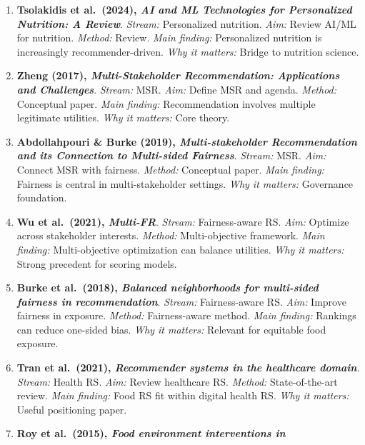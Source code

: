 \documentclass[
  letterpaper,
  DIV=11,
  numbers=noendperiod]{scrartcl}
\begin{document}
\begin{enumerate}
  \textbf{Workplace explanation study (2025)}. \emph{Stream:}
  Explainability. \emph{Aim:} Study explanations in deployment.
  \emph{Method:} User-centered deployment study. \emph{Main finding:}
  Explanations improve understanding and control. \emph{Why it matters:}
  Relevant for trust and adoption.
\item
  \textbf{Tsolakidis et al.~(2024), \emph{AI and ML Technologies for
  Personalized Nutrition: A Review}}. \emph{Stream:} Personalized
  nutrition. \emph{Aim:} Review AI/ML for nutrition. \emph{Method:}
  Review. \emph{Main finding:} Personalized nutrition is increasingly
  recommender-driven. \emph{Why it matters:} Bridge to nutrition
  science.
\item
  \textbf{Zheng (2017), \emph{Multi-Stakeholder Recommendation:
  Applications and Challenges}}. \emph{Stream:} MSR. \emph{Aim:} Define
  MSR and agenda. \emph{Method:} Conceptual paper. \emph{Main finding:}
  Recommendation involves multiple legitimate utilities. \emph{Why it
  matters:} Core theory.
\item
  \textbf{Abdollahpouri \& Burke (2019), \emph{Multi-stakeholder
  Recommendation and its Connection to Multi-sided Fairness}}.
  \emph{Stream:} MSR. \emph{Aim:} Connect MSR with fairness.
  \emph{Method:} Conceptual paper. \emph{Main finding:} Fairness is
  central in multi-stakeholder settings. \emph{Why it matters:}
  Governance foundation.
\item
  \textbf{Wu et al.~(2021), \emph{Multi-FR}}. \emph{Stream:}
  Fairness-aware RS. \emph{Aim:} Optimize across stakeholder interests.
  \emph{Method:} Multi-objective framework. \emph{Main finding:}
  Multi-objective optimization can balance utilities. \emph{Why it
  matters:} Strong precedent for scoring models.
\item
  \textbf{Burke et al.~(2018), \emph{Balanced neighborhoods for
  multi-sided fairness in recommendation}}. \emph{Stream:}
  Fairness-aware RS. \emph{Aim:} Improve fairness in exposure.
  \emph{Method:} Fairness-aware method. \emph{Main finding:} Rankings
  can reduce one-sided bias. \emph{Why it matters:} Relevant for
  equitable food exposure.
\item
  \textbf{Tran et al.~(2021), \emph{Recommender systems in the
  healthcare domain}}. \emph{Stream:} Health RS. \emph{Aim:} Review
  healthcare RS. \emph{Method:} State-of-the-art review. \emph{Main
  finding:} Food RS fit within digital health RS. \emph{Why it matters:}
  Useful positioning paper.
\item
  \textbf{Roy et al.~(2015), \emph{Food environment interventions in
}}
\end{enumerate}
\end{document}
